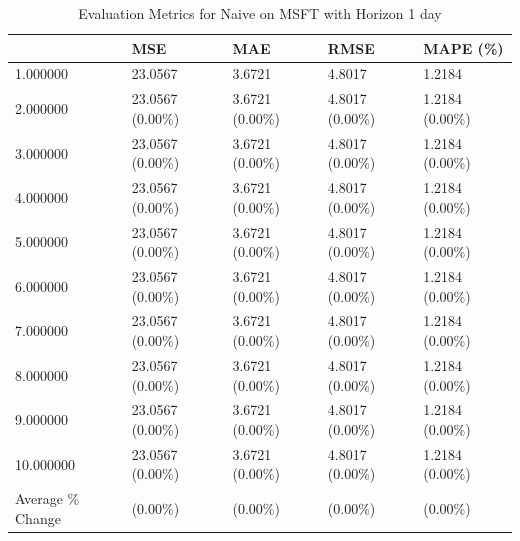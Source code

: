 \begin{table}
\caption{Evaluation Metrics for Naive on MSFT with Horizon 1 day}
\label{tab:naive_MSFT_h1_metrics}
\begin{tabular}{lllll}
\toprule
 & MSE & MAE & RMSE & MAPE (\%) \\
\midrule
1.000000 & 23.0567 & 3.6721 & 4.8017 & 1.2184 \\
2.000000 & 23.0567 (0.00\%) & 3.6721 (0.00\%) & 4.8017 (0.00\%) & 1.2184 (0.00\%) \\
3.000000 & 23.0567 (0.00\%) & 3.6721 (0.00\%) & 4.8017 (0.00\%) & 1.2184 (0.00\%) \\
4.000000 & 23.0567 (0.00\%) & 3.6721 (0.00\%) & 4.8017 (0.00\%) & 1.2184 (0.00\%) \\
5.000000 & 23.0567 (0.00\%) & 3.6721 (0.00\%) & 4.8017 (0.00\%) & 1.2184 (0.00\%) \\
6.000000 & 23.0567 (0.00\%) & 3.6721 (0.00\%) & 4.8017 (0.00\%) & 1.2184 (0.00\%) \\
7.000000 & 23.0567 (0.00\%) & 3.6721 (0.00\%) & 4.8017 (0.00\%) & 1.2184 (0.00\%) \\
8.000000 & 23.0567 (0.00\%) & 3.6721 (0.00\%) & 4.8017 (0.00\%) & 1.2184 (0.00\%) \\
9.000000 & 23.0567 (0.00\%) & 3.6721 (0.00\%) & 4.8017 (0.00\%) & 1.2184 (0.00\%) \\
10.000000 & 23.0567 (0.00\%) & 3.6721 (0.00\%) & 4.8017 (0.00\%) & 1.2184 (0.00\%) \\
Average \% Change & (0.00\%) & (0.00\%) & (0.00\%) & (0.00\%) \\
\bottomrule
\end{tabular}
\end{table}

